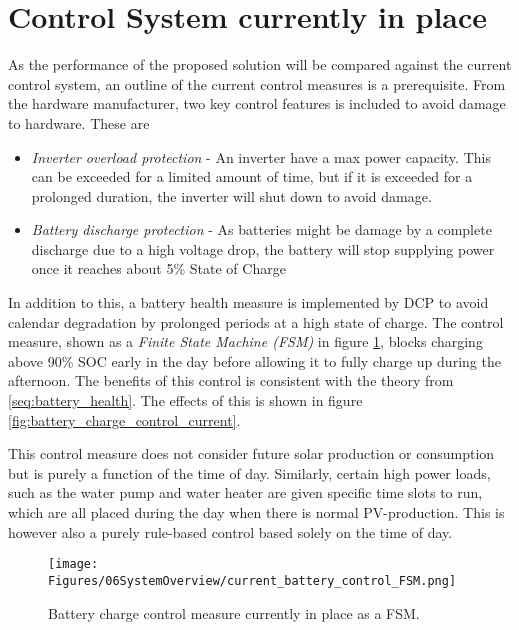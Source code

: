 \section{Control System currently in place}\label{seq:current_syst}
As the performance of the proposed solution will be compared against the current control system, an outline of the current control measures is a prerequisite. From the hardware manufacturer, two key control features is included to avoid damage to hardware. These are
\begin{itemize}
    \item \textit{Inverter overload protection} -   An inverter have a max power capacity. This can be exceeded for a limited amount of time, but if it is exceeded for a prolonged duration, the inverter will shut down to avoid damage. 
    \item \textit{Battery discharge protection} -   As batteries might be damage by a complete discharge due to a high voltage drop, the battery will stop supplying power once it reaches about 5\% State of Charge
\end{itemize}

In addition to this, a battery health measure is implemented by DCP to avoid calendar degradation by prolonged periods at a high state of charge. The control measure, shown as a \textit{Finite State Machine (FSM)} in figure \ref{fig:current_battery_control_FSM}, blocks charging above 90\% SOC early in the day before allowing it to fully charge up during the afternoon. The benefits of this control is consistent with the theory from \ref{seq:battery_health}. The effects of this is shown in figure \ref{fig:battery_charge_control_current}. 

This control measure does not consider future solar production or consumption but is purely a function of the time of day. Similarly, certain high power loads, such as the water pump and water heater are given specific time slots to run, which are all placed during the day when there is normal PV-production. This is however also a purely rule-based control based solely on the time of day.

\begin{figure}[h]
    \centering
    \texttt{[image: Figures/06SystemOverview/current\_battery\_control\_FSM.png]}
    \caption[Current Battery charge control system FSM]{Battery charge control measure currently in place as a FSM.}
    \label{fig:current_battery_control_FSM}
\end{figure}

